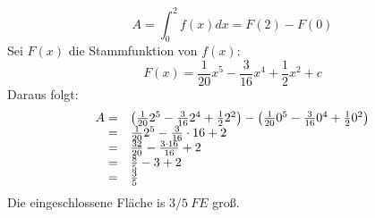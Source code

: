 \documentclass[main.tex]{subfiles}
\begin{document}
\begin{equation*}
A=\int _{0}^{2} f( x) dx=F( 2) -F( 0)
\end{equation*}Sei $F( x)$ die Stammfunktion von $f( x)$:
\begin{equation*}
F( x) =\frac{1}{20} x^{5} -\frac{3}{16} x^{4} +\frac{1}{2} x^{2} +c
\end{equation*}
Daraus folgt:
\begin{equation*}
\begin{array}{ r l }
A= & \left(\frac{1}{20} 2^{5} -\frac{3}{16} 2^{4} +\frac{1}{2} 2^{2}\right) -\left(\frac{1}{20} 0^{5} -\frac{3}{16} 0^{4} +\frac{1}{2} 0^{2}\right)\\
= & \frac{1}{20} 2^{5} -\frac{3}{16} \cdotp 16+2\\
= & \frac{32}{20} -\frac{3\cdotp 16}{16} +2\\
= & \frac{8}{5} -3+2\\
= & \frac{3}{5}
\end{array}
\end{equation*}
Die eingeschlossene Fläche is $3/5\ FE$ groß.
\end{document}
